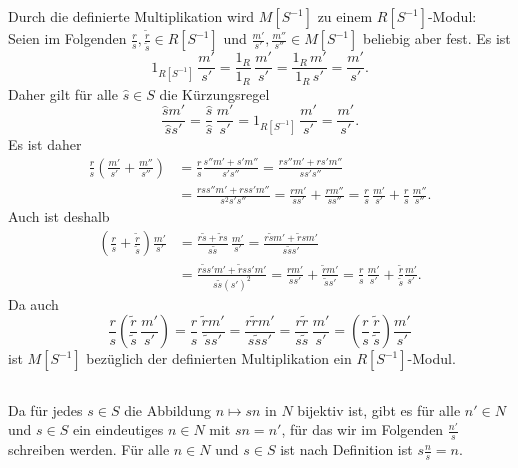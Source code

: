 \documentclass[a4paper,10pt]{article}
\theoremstyle{definition}
\begin{document}
Durch die definierte Multiplikation wird $M[S^{-1}]$ zu einem $R[S^{-1}]$-Modul: Seien im Folgenden $\frac{r}{s}, \frac{\tilde{r}}{\tilde{s}} \in R[S^{-1}]$ und $\frac{m'}{s'}, \frac{m''}{s''} \in M[S^{-1}]$  beliebig aber fest. Es ist
\[
 1_{R[S^{-1}]} \,\frac{m'}{s'}
 = \frac{1_R}{1_R} \, \frac{m'}{s'}
 = \frac{1_R \, m'}{1_R \, s'}
 = \frac{m'}{s'}.
\]
Daher gilt für alle $\hat{s} \in S$ die Kürzungsregel
\[
 \frac{\hat{s}m'}{\hat{s}s'}
 = \frac{\hat{s}}{\hat{s}} \, \frac{m'}{s'}
 = 1_{R[S^{-1}]} \, \frac{m'}{s'}
 = \frac{m'}{s'}.
\]
Es ist daher
\begin{align*}
 \frac{r}{s} \left( \frac{m'}{s'} + \frac{m''}{s''} \right)
 &= \frac{r}{s} \frac{s''m' + s'm''}{s's''}
 = \frac{rs''m' + rs'm''}{ss's''} \\
 &= \frac{rss''m' + rss'm''}{s^2s's''}
 = \frac{rm'}{ss'} + \frac{rm''}{ss''}
 = \frac{r}{s} \, \frac{m'}{s'} + \frac{r}{s} \, \frac{m''}{s''}.
\end{align*}
Auch ist deshalb
\begin{align*}
 \left(\frac{r}{s} + \frac{\tilde{r}}{\tilde{s}}\right) \frac{m'}{s'}
 &= \frac{r\tilde{s}+\tilde{r}s}{s\tilde{s}} \, \frac{m'}{s'}
 = \frac{r\tilde{s}m' + \tilde{r}sm'}{s\tilde{s}s'} \\
 &= \frac{r\tilde{s}s'm' + \tilde{r}ss'm'}{s\tilde{s}(s')^2}
 = \frac{rm'}{ss'} + \frac{\tilde{r}m'}{\tilde{s}s'}
 = \frac{r}{s} \, \frac{m'}{s'} + \frac{\tilde{r}}{\tilde{s}} \frac{m'}{s'}.
\end{align*}
Da auch
\[
 \frac{r}{s} \left(\frac{\tilde{r}}{\tilde{s}} \, \frac{m'}{s'}\right)
 = \frac{r}{s} \, \frac{\tilde{r} m'}{\tilde{s} s'}
 = \frac{r \tilde{r} m'}{s \tilde{s} s'}
 = \frac{r \tilde{r}}{s \tilde{s}} \, \frac{m'}{s'}
 = \left( \frac{r}{s} \, \frac{\tilde{r}}{\tilde{s}} \right) \frac{m'}{s'}
\]
ist $M[S^{-1}]$ bezüglich der definierten Multiplikation ein $R[S^{-1}]$-Modul.


\subsection{}
Da für jedes $s \in S$ die Abbildung $n \mapsto s n$ in $N$ bijektiv ist, gibt es für alle $n' \in N$ und $s \in S$ ein eindeutiges $n \in N$ mit $sn = n'$, für das wir im Folgenden $\frac{n'}{s}$ schreiben werden. Für alle $n \in N$ und $s \in S$ ist nach Definition ist $s \frac{n}{s} = n$.
\end{document}
